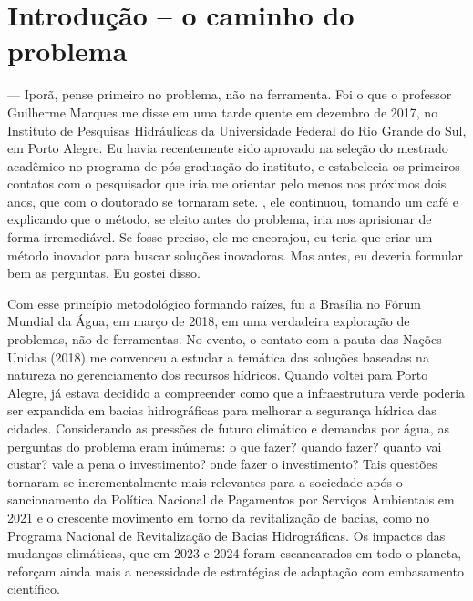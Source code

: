 \documentclass[./main.tex]{subfiles}
\begin{document}
\chapter{Introdução -- o caminho do problema}

\setlength{\parskip}{\myparskip}

 --- Iporã, pense primeiro no problema, não na ferramenta. 
\vspace{0.5cm}\newline
\noindent Foi o que o professor Guilherme Marques me disse em uma tarde quente em dezembro de 2017, no Instituto de Pesquisas Hidráulicas da Universidade Federal do Rio Grande do Sul, em Porto Alegre. Eu havia recentemente sido aprovado na seleção do mestrado acadêmico no programa de pós-graduação do instituto, e estabelecia os primeiros contatos com o pesquisador que iria me orientar pelo menos nos próximos dois anos, que com o doutorado se tornaram sete. , ele continuou, tomando um café e explicando que o método, se eleito antes do problema, iria nos aprisionar de forma irremediável. Se fosse preciso, ele me encorajou, eu teria que criar um método inovador para buscar soluções inovadoras. Mas antes, eu deveria formular bem as perguntas. Eu gostei disso. 

\par Com esse princípio metodológico formando raízes, fui a Brasília no Fórum Mundial da Água, em março de 2018, em uma verdadeira exploração de problemas, não de ferramentas. No evento, o contato com a pauta das Nações Unidas (2018) \cite{un2018} me convenceu a estudar a temática das soluções baseadas na natureza no gerenciamento dos recursos hídricos. Quando voltei para Porto Alegre, já estava decidido a compreender como que a infraestrutura verde poderia ser expandida em bacias hidrográficas para melhorar a segurança hídrica das cidades. Considerando as pressões de futuro climático e demandas por água, as perguntas do problema eram inúmeras: o que fazer? quando fazer? quanto vai custar? vale a pena o investimento? onde fazer o investimento? Tais questões tornaram-se incrementalmente mais relevantes para a sociedade após o sancionamento da Política Nacional de Pagamentos por Serviços Ambientais em 2021 \cite{brasil2021} e o crescente movimento em torno da revitalização de bacias, como no Programa Nacional de Revitalização de Bacias Hidrográficas. Os impactos das mudanças climáticas, que em 2023 e 2024 foram escancarados em todo o planeta, reforçam ainda mais a necessidade de estratégias de adaptação com embasamento científico. 
\end{document}
